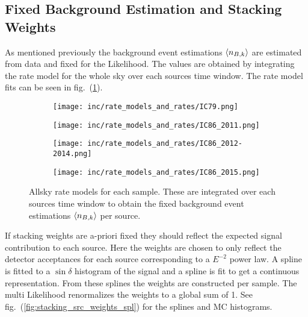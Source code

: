 \subsection{Fixed Background Estimation and Stacking Weights}
As mentioned previously the background event estimations $\braket{n_{B,k}}$ are estimated from data and fixed for the Likelihood.
The values are obtained by integrating the rate model for the whole sky over each sources time window.
The rate model fits can be seen in fig.~(\ref{fig:rate_allsky}).

\begin{figure}[h]
  \centering
  \begin{subfigure}[c]{0.49\textwidth}
    \texttt{[image: inc/rate\_models\_and\_rates/IC79.png]}
  \end{subfigure}
  \hfill
  \begin{subfigure}[c]{0.49\textwidth}
    \texttt{[image: inc/rate\_models\_and\_rates/IC86\_2011.png]}
  \end{subfigure}

  \begin{subfigure}[c]{0.49\textwidth}
    \texttt{[image: inc/rate\_models\_and\_rates/IC86\_2012-2014.png]}
  \end{subfigure}
  \hfill
  \begin{subfigure}[c]{0.49\textwidth}
    \texttt{[image: inc/rate\_models\_and\_rates/IC86\_2015.png]}
  \end{subfigure}

  \caption{Allsky rate models for each sample. These are integrated over each sources time window to obtain the fixed background event estimations $\braket{n_{B,k}}$ per source.}
  \label{fig:rate_allsky}
\end{figure}

If stacking weights are a-priori fixed they should reflect the expected signal contribution to each source.
Here the weights are chosen to only reflect the detector acceptances for each source corresponding to a $E^{-2}$ power law.
A spline is fitted to a $\sin\delta$ histogram of the signal and a spline is fit to get a continuous representation.
From these splines the weights are constructed per sample.
The multi Likelihood renormalizes the weights to a global sum of 1.
See fig.~(\ref{fig:stacking_src_weights_spl}) for the splines and MC histograms.

